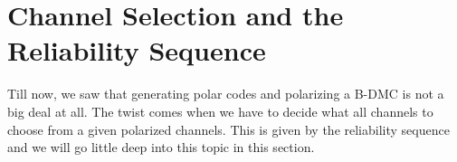 \documentclass{article}
\begin{document}
\section{Channel Selection and the Reliability Sequence}
Till now, we saw that generating polar codes and polarizing a B-DMC is not a big deal at all. The twist comes when we have to decide what all channels to choose from a given polarized channels. This is given by the reliability sequence and we will go little deep into this topic in this section.
\end{document}
